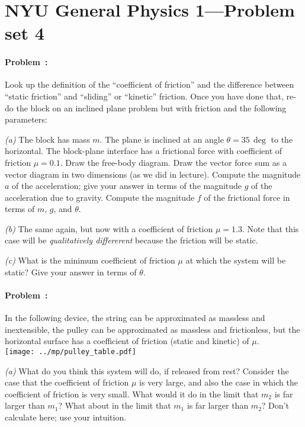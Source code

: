 \documentclass[12pt]{article}
\begin{document}
\thispagestyle{empty}

\section*{NYU General Physics 1---Problem set 4}

\paragraph{Problem~\theproblem:}%
Look up the definition of the ``coefficient of friction'' and the
difference between ``static friction'' and ``sliding'' or ``kinetic''
friction.  Once you have done that, re-do the block on an inclined
plane problem but with friction and the following parameters:

\textsl{(a)} The block has mass $m$.  The plane is inclined at an
angle $\theta=35\,\deg$ to the horizontal.  The block-plane interface
has a frictional force with coefficient of friction $\mu=0.1$.  Draw
the free-body diagram.  Draw the vector force sum as a vector diagram
in two dimensions (as we did in lecture).  Compute the magnitude $a$
of the acceleration; give your answer in terms of the magnitude $g$ of
the acceleration due to gravity.  Compute the magnitude $f$ of the
frictional force in terms of $m$, $g$, and $\theta$.

\textsl{(b)} The same again, but now with a coefficient of friction
$\mu=1.3$.  Note that this case will be \emph{qualitatively
  differerent} because the friction will be static.

\textsl{(c)} What is the minimum coefficient of friction $\mu$ at
which the system will be static?  Give your answer in terms of
$\theta$.

\paragraph{Problem~\theproblem:}%
In the following device, the string can be approximated as massless
and inextensible, the pulley can be approximated as massless and
frictionless, but the horizontal surface has a coefficient of friction
(static and kinetic) of $\mu$.\\[1ex]
\texttt{[image: ../mp/pulley\_table.pdf]}

\textsl{(a)} What do you think this system will do, if released from
rest?  Consider the case that the coefficient of friction $\mu$ is
very large, and also the case in which the coefficient of friction is
very small.  What would it do in the limit that $m_2$ is far larger
than $m_1$?  What about in the limit that $m_1$ is far larger than
$m_2$?  Don't calculate here; use your intuition.
\end{document}
